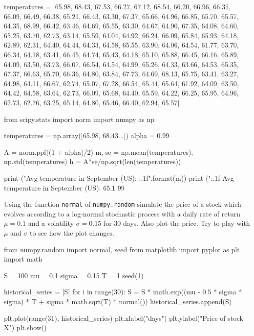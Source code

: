 \begin{ipython}
temperatures = [65.98, 68.43, 67.53, 66.27, 67.12, 68.54, 66.20, 66.96, 66.31, 66.09,
66.49, 66.38, 65.21, 66.43, 63.30, 67.37, 65.66, 64.96, 66.85, 65.70, 65.57, 64.35,
68.99, 66.42, 63.46, 64.69, 65.55, 63.30, 64.67, 64.90, 67.35, 64.08, 64.60, 65.25,
63.70, 62.73, 63.14, 65.59, 64.04, 64.92, 66.24, 66.09, 65.84, 65.93, 64.18, 62.89,
62.31, 64.40, 64.44, 64.33, 64.58, 65.55, 63.90, 64.06, 64.54, 61.77, 63.70, 66.34,
64.18, 63.41, 66.45, 64.74, 65.43, 64.18, 65.10, 65.88, 66.45, 66.16, 65.89, 64.09,
63.50, 63.73, 66.07, 66.54, 64.54, 64.99, 65.26, 64.33, 63.66, 64.53, 65.35, 67.37,
66.63, 65.70, 66.36, 64.80, 63.84, 67.73, 64.69, 68.13, 65.75, 63.41, 63.27, 64.98,
64.11, 66.67, 62.74, 65.07, 67.28, 66.54, 65.44, 65.64, 61.92, 64.09, 63.50, 64.42,
64.58, 63.64, 62.73, 66.09, 65.68, 64.40, 65.59, 64.22, 66.25, 65.95, 64.96, 62.73,
62.76, 63.25, 65.14, 64.80, 65.46, 66.40, 62.94, 65.57]
\end{ipython}

\begin{solution}
\end{solution}

\begin{ipython}
from scipy.stats import norm
import numpy as np

temperatures = np.array([65.98, 68.43...])
alpha = 0.99

A = norm.ppf((1 + alpha)/2)
m, se = np.mean(temperatures), np.std(temperatures)
h = A*se/np.sqrt(len(temperatures))

print ("Avg temperature in September (US): {:.1f}".format(m))
print ("{:.1f}%
Avg temperature in September (US): 65.1
99%
\end{ipython}

\begin{question}
Using the function \texttt{normal} of \texttt{numpy.random} simulate the price of a stock which evolves according to a log-normal stochastic process with a daily rate of return \(\mu=0.1\) and a volatility \(\sigma=0.15\) for 30 days.
Also plot the price. Try to play with \(\mu\) and \(\sigma\) to see how the plot changes.
\end{question}

\begin{solution}
\end{solution}

\begin{ipython}
from numpy.random import normal, seed
from matplotlib import pyplot as plt
import math

S = 100
mu = 0.1
sigma = 0.15
T = 1
seed(1)

historical_series = [S]
for i in range(30):
    S = S * math.exp((mu - 0.5 * sigma * sigma) * T +
        sigma * math.sqrt(T) * normal())
    historical_series.append(S)

plt.plot(range(31), historical_series)
plt.xlabel("days")
plt.ylabel("Price of stock X")
plt.show()
\end{ipython}

